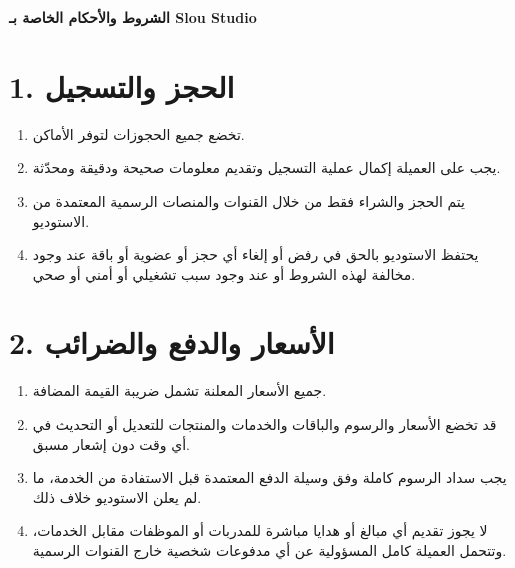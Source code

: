 \documentclass[12pt,a4paper]{article}
\begin{document}
\begin{center}
    {\Large\bfseries الشروط والأحكام الخاصة بـ Slou Studio}
\end{center}

\vspace{1em}


\section*{1. الحجز والتسجيل}
\begin{enumerate}
    \item تخضع جميع الحجوزات لتوفر الأماكن.
    \item يجب على العميلة إكمال عملية التسجيل وتقديم معلومات صحيحة ودقيقة ومحدّثة.
    \item يتم الحجز والشراء فقط من خلال القنوات والمنصات الرسمية المعتمدة من الاستوديو.
    \item يحتفظ الاستوديو بالحق في رفض أو إلغاء أي حجز أو عضوية أو باقة عند وجود مخالفة لهذه الشروط أو عند وجود سبب تشغيلي أو أمني أو صحي.
\end{enumerate}

\section*{2. الأسعار والدفع والضرائب}
\begin{enumerate}
    \item جميع الأسعار المعلنة تشمل ضريبة القيمة المضافة.
    \item قد تخضع الأسعار والرسوم والباقات والخدمات والمنتجات للتعديل أو التحديث في أي وقت دون إشعار مسبق.
    \item يجب سداد الرسوم كاملة وفق وسيلة الدفع المعتمدة قبل الاستفادة من الخدمة، ما لم يعلن الاستوديو خلاف ذلك.
    \item لا يجوز تقديم أي مبالغ أو هدايا مباشرة للمدربات أو الموظفات مقابل الخدمات، وتتحمل العميلة كامل المسؤولية عن أي مدفوعات شخصية خارج القنوات الرسمية.
\end{enumerate}
\end{document}
